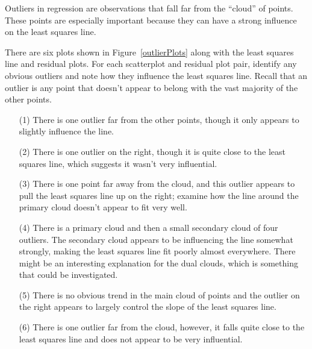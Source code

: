 Outliers in regression are observations that fall far from the ``cloud'' of points. These points are especially important because they can have a strong influence on the least squares line. 

\begin{examplewrap}
\begin{nexample}{There are six plots shown in Figure~\ref{outlierPlots} along with the least squares line and residual plots. For each scatterplot and residual plot pair, identify any obvious outliers and note how they influence the least squares line. Recall that an outlier is any point that doesn't appear to belong with the vast majority of the other points.}\label{outlierPlotsExample}
\begin{itemize}
\setlength{\itemsep}{0mm}
\item[(1)] There is one outlier far from the other points, though it only appears to slightly influence the line.
\item[(2)] There is one outlier on the right, though it is quite close to the least squares line, which suggests it wasn't very influential.
\item[(3)] There is one point far away from the cloud, and this outlier appears to pull the least squares line up on the right; examine how the line around the primary cloud doesn't appear to fit very well.
\item[(4)] There is a primary cloud and then a small secondary cloud of four outliers. The secondary cloud appears to be influencing the line somewhat strongly, making the least squares line fit poorly almost everywhere. There might be an interesting explanation for the dual clouds, which is something that could be investigated.
\item[(5)] There is no obvious trend in the main cloud of points and the outlier on the right appears to largely control the slope of the least squares line.
\item[(6)] There is one outlier far from the cloud, however, it falls quite close to the least squares line and does not appear to be very influential.
\end{itemize}
\end{nexample}
\end{examplewrap}

